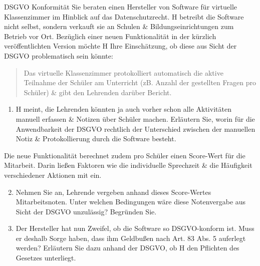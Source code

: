 \documentclass{exercisesheet}
\begin{document}
\begin{exercise}{DSGVO Konformität}
  Sie beraten einen Hersteller von Software für virtuelle Klassenzimmer im Hinblick auf das Datenschutzrecht. H betreibt die Software nicht selbst, sondern verkauft sie an Schulen \& Bildungseinrichtungen zum Betrieb vor Ort. Bezüglich einer neuen Funktionalität in der kürzlich veröffentlichten Version möchte H Ihre Einschätzung, ob diese aus Sicht der DSGVO problematisch sein könnte:
  \begin{quote}
    Das virtuelle Klassenzimmer protokolliert automatisch die aktive Teilnahme der Schüler am Unterricht (zB. Anzahl der gestellten Fragen pro Schüler) \& gibt den Lehrenden darüber Bericht.
  \end{quote}

  \begin{enumerate}
    \item H meint, die Lehrenden könnten ja auch vorher schon alle Aktivitäten manuell erfassen \& Notizen über Schüler machen. Erläutern Sie, worin für die Anwendbarkeit der DSGVO rechtlich der Unterschied zwischen der manuellen Notiz \& Protokollierung durch die Software besteht.
  \end{enumerate}

  Die neue Funktionalität berechnet zudem pro Schüler einen Score-Wert für die Mitarbeit. Darin ließen Faktoren wie die individuelle Sprechzeit \& die Häufigkeit verschiedener Aktionen mit ein.

  \begin{enumerate}
    \setcounter{enumi}{1}
    \item Nehmen Sie an, Lehrende vergeben anhand dieses Score-Wertes Mitarbeitsnoten. Unter welchen Bedingungen wäre diese Notenvergabe aus Sicht der DSGVO unzulässig? Begründen Sie.
    \item Der Hersteller hat nun Zweifel, ob die Software so DSGVO-konform ist. Muss er deshalb Sorge haben, dass ihm Geldbußen nach Art. 83 Abs. 5 auferlegt werden? Erläutern Sie dazu anhand der DSGVO, ob H den Pflichten des Gesetzes unterliegt.
  \end{enumerate}
\end{exercise}
\end{document}
